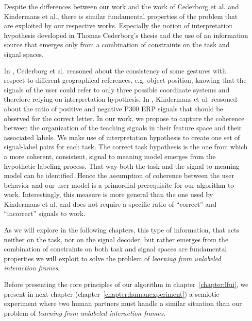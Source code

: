 Despite the differences between our work and the work of Cederborg et al. and Kindermans et al., there is similar fundamental properties of the problem that are exploited by our respective works. Especially the notion of interpretation hypothesis developed in Thomas Cederborg's thesis and the use of an information source that emerges only from a combination of constraints on the task and signal spaces. 

In \cite{cederborg2011imitating}, Cederborg et al. reasoned about the consistency of some gestures with respect to different geographical references, e.g. object position, knowing that the signals of the user could refer to only three possible coordinate systems and therefore relying on interpretation hypothesis. In \cite{Kindermans2012a,kindermans2014true}, Kindermans et al. reasoned about the ratio of positive and negative P300 ERP signals that should be observed for the correct letter. In our work, we propose to capture the coherence between the organization of the teaching signals in their feature space and their associated labels. We make use of interpretation hypothesis to create one set of signal-label pairs for each task. The correct task hypothesis is the one from which a more coherent, consistent, signal to meaning model emerges from the hypothetic labeling process. That way both the task and the signal to meaning model can be identified. Hence the assumption of coherence between the user behavior and our user model is a primordial prerequisite for our algorithm to work. Interestingly, this measure is more general than the one used by Kindermans et al. and does not require a specific ratio of  ``correct'' and ``incorrect'' signals to work.

As we will explore in the following chapters, this type of information, that acts neither on the task, nor on the signal decoder, but rather emerges from the combination of constraints on both task and signal spaces are fundamental properties we will exploit to solve the problem of \emph{learning from unlabeled interaction frames}.

\transition

Before presenting the core principles of our algorithm in chapter~\ref{chapter:lfui}, we present in next chapter (chapter~\ref{chapter:humanexperiment}) a semiotic experiment where two human partners must handle a similar situation than our problem of \emph{learning from unlabeled interaction frames}.

